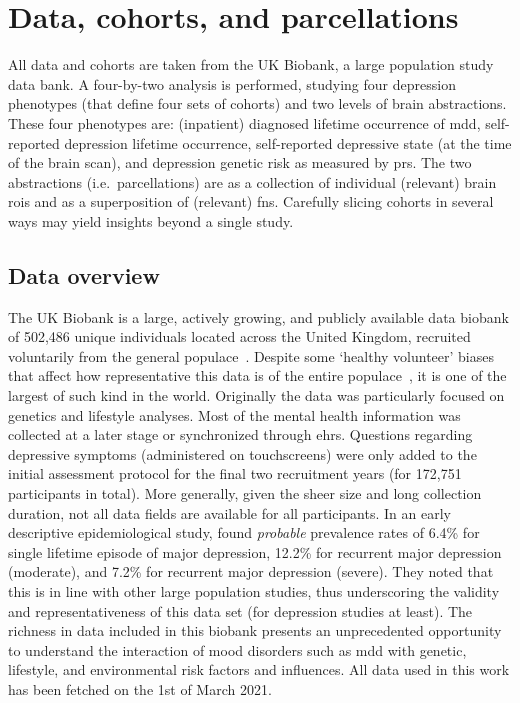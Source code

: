 \clearpage
\section{Data, cohorts, and parcellations}\label{sec:ukb-data}

All data and cohorts are taken from the UK Biobank, a large population study data bank.
A four-by-two analysis is performed, studying four depression phenotypes (that define four sets of cohorts) and two levels of brain abstractions.
These four phenotypes are: (inpatient) diagnosed lifetime occurrence of \gls{mdd}, self-reported depression lifetime occurrence, self-reported depressive state (at the time of the brain scan), and depression genetic risk as measured by \gls{prs}.
The two abstractions (i.e.~parcellations) are as a collection of individual (relevant) brain \glspl{roi} and as a superposition of (relevant) \glspl{fn}.
Carefully slicing cohorts in several ways may yield insights beyond a single study.

\subsection{Data overview}

The UK Biobank is a large, actively growing, and publicly available data biobank of 502,486 unique individuals located across the United Kingdom, recruited voluntarily from the general populace~\parencite{Collins2012, Allen2014b}.
Despite some `healthy volunteer' biases that affect how representative this data is of the entire populace~\parencite[see][]{Fry2017}, it is one of the largest of such kind in the world.
%
Originally the data was particularly focused on genetics and lifestyle analyses.
Most of the mental health information was collected at a later stage or synchronized through \glspl{ehr}.
Questions regarding depressive symptoms (administered on touchscreens) were only added to the initial assessment protocol for the final two recruitment years (for 172,751 participants in total).
More generally, given the sheer size and long collection duration, not all data fields are available for all participants.
%
In an early descriptive epidemiological study, \textcite{Smith2013c} found \emph{probable} prevalence rates of 6.4\% for single lifetime episode of major depression, 12.2\% for recurrent major depression (moderate), and 7.2\% for recurrent major depression (severe).
They noted that this is in line with other large population studies, thus underscoring the validity and representativeness of this data set (for depression studies at least).
The richness in data included in this biobank presents an unprecedented opportunity to understand the interaction of mood disorders such as \gls{mdd} with genetic, lifestyle, and environmental risk factors and influences.
All data used in this work has been fetched on the 1st of March 2021.

